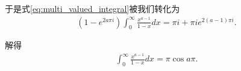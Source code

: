 \begin{solution}
            于是式\ref{eq:multi_valued_integral}被我们转化为
            \begin{align*}
                (1-e^{2a\pi i})\int_{0}^{\infty}\frac{x^{a-1}}{1-x}dx=\pi i+\pi ie^{2(a-1)\pi i}.
            \end{align*}

            解得
            \begin{align*}
                \int_{0}^{\infty}\frac{x^{a-1}}{1-x}dx=\pi \cos{a\pi}.
            \end{align*}


        \end{solution}
